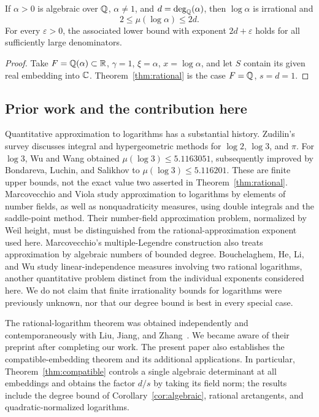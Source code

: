 \begin{corollary}\label{cor:algebraic}
If \(\alpha>0\) is algebraic over \(\mathbb Q\), \(\alpha\ne1\), and
\(d=\deg_{\mathbb Q}(\alpha)\), then \(\log\alpha\) is irrational and
\[
 2\le\mu(\log\alpha)\le2d.
\]
For every \(\varepsilon>0\), the associated lower bound with exponent
\(2d+\varepsilon\) holds for all sufficiently large denominators.
\end{corollary}
\begin{proof}
Take \(F=\mathbb Q(\alpha)\subset\mathbb R\), \(\gamma=1\),
\(\xi=\alpha\), \(x=\log\alpha\), and let \(S\) contain its given real
embedding into \(\mathbb C\). Theorem~\ref{thm:rational} is the case
\(F=\mathbb Q\), \(s=d=1\).
\end{proof}

\subsection{Prior work and the contribution here}

Quantitative approximation to logarithms has a substantial history.
Zudilin's survey \cite{Zudilin2004} discusses integral and hypergeometric
methods for \(\log2\), \(\log3\), and \(\pi\).
For \(\log3\), Wu and Wang \cite[Corollary~1]{WuWang2014} obtained
\(\mu(\log3)\le5.1163051\), subsequently improved by Bondareva,
Luchin, and Salikhov \cite[Corollary~1]{BLS2018} to
\(\mu(\log3)\le5.116201\). These are finite upper bounds,
not the exact value two asserted in Theorem~\ref{thm:rational}.
Marcovecchio and Viola \cite{MV2012} study approximation to logarithms
by elements of number fields, as well as nonquadraticity measures,
using double integrals and the saddle-point method.
Their number-field approximation problem, normalized by Weil height,
must be distinguished from the rational-approximation exponent used here.
Marcovecchio's multiple-Legendre construction \cite{Marcovecchio2014}
also treats approximation by algebraic numbers of bounded degree.
Bouchelaghem, He, Li, and Wu \cite{BHLW2024} study linear-independence
measures involving two rational logarithms, another quantitative problem
distinct from the individual exponents considered here.
We do not claim that finite irrationality bounds for logarithms were
previously unknown, nor that our degree bound is best in every special
case.

The rational-logarithm theorem was obtained independently and
contemporaneously with Liu, Jiang, and Zhang~\cite{LJZ2026}.
We became aware of their preprint after completing our work.
The present paper also establishes the compatible-embedding theorem and
its additional applications. In particular, Theorem~\ref{thm:compatible}
controls a single algebraic determinant at all embeddings and obtains
the factor \(d/s\) by taking its field norm; the results include the
degree bound of Corollary~\ref{cor:algebraic}, rational arctangents, and
quadratic-normalized logarithms.

